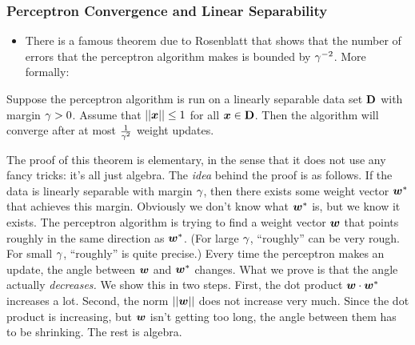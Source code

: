 \documentclass[trans]{beamer}
\begin{document}
\begin{frame}
  \frametitle{Perceptron Convergence and Linear Separability}
\begin{itemize}
\item
There is a famous theorem due to
Rosenblatt %
that shows that the number
of errors that the perceptron algorithm makes is bounded by
$\gamma^{-2}$.  More formally:
\end{itemize}
\begin{theorem} \label{thm:perc:perc}
  Suppose the perceptron algorithm is run on a linearly separable data
  set $\text{\bf D}$ with margin $\gamma > 0$.  Assume that $\left\vert\left\vert {\boldsymbol{x}} \right\vert\right\vert \leq 1$
  for all ${\boldsymbol{x}} \in \text{\bf D}$.  Then the algorithm will converge after at
  most $\frac 1 {\gamma^2}$ weight updates.
\end{theorem}

\end{frame}
\iffalse
The proof of this theorem is elementary, in the sense that it does not
use any fancy tricks: it's all just algebra.  The \emph{idea} behind
the proof is as follows.  If the data is linearly separable with
margin $\gamma$, then there exists some weight vector ${\boldsymbol{w}}^*$ that
achieves this margin.  Obviously we don't know what ${\boldsymbol{w}}^*$ is, but we
know it exists.  The perceptron algorithm is trying to find a weight
vector ${\boldsymbol{w}}$ that points roughly in the same direction as ${\boldsymbol{w}}^*$.
(For large $\gamma$, ``roughly'' can be very rough.  For small $\gamma$,
``roughly'' is quite precise.)  Every time the perceptron makes an
update, the angle between ${\boldsymbol{w}}$ and ${\boldsymbol{w}}^*$ changes.  What we prove is
that the angle actually \emph{decreases.}  We show this in two steps.
First, the dot product ${\boldsymbol{w}} \cdot {\boldsymbol{w}}^*$ increases a lot.  Second,
the norm $\left\vert\left\vert {\boldsymbol{w}} \right\vert\right\vert$ does not increase very much.  Since the dot
product is increasing, but ${\boldsymbol{w}}$ isn't getting too long, the angle
between them has to be shrinking.  The rest is algebra.
\end{document}
